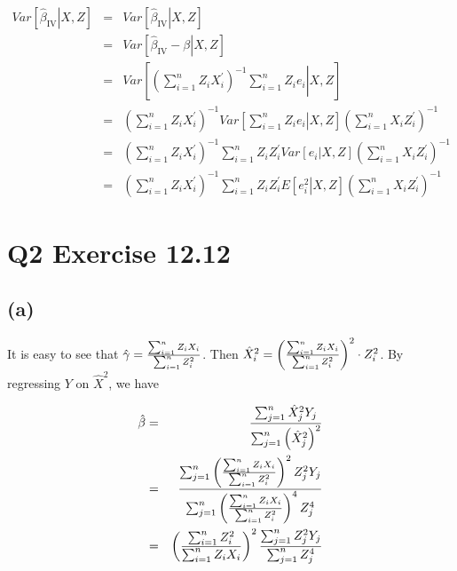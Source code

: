 \documentclass{article}
\begin{document}
\begin{eqnarray*}
Var\left[ \left. \hat{\beta}_{\text{IV}}\right\vert X,Z\right] &=&Var\left[
\left. \hat{\beta}_{\text{IV}}\right\vert X,Z\right] \\
&=&Var\left[ \left. \hat{\beta}_{\text{IV}}-\beta \right\vert X,Z\right] \\
&=&Var\left[ \left. \left( \sum_{i=1}^{n}Z_{i}X_{i}^{\prime }\right)
^{-1}\sum_{i=1}^{n}Z_{i}e_{i}\right\vert X,Z\right] \\
&=&\left( \sum_{i=1}^{n}Z_{i}X_{i}^{\prime }\right) ^{-1}Var\left[ \left.
\sum_{i=1}^{n}Z_{i}e_{i}\right\vert X,Z\right] \left(
\sum_{i=1}^{n}X_{i}Z_{i}^{\prime }\right) ^{-1} \\
&=&\left( \sum_{i=1}^{n}Z_{i}X_{i}^{\prime }\right)
^{-1}\sum_{i=1}^{n}Z_{i}Z_{i}^{\prime }Var\left[ \left. e_{i}\right\vert X,Z%
\right] \left( \sum_{i=1}^{n}X_{i}Z_{i}^{\prime }\right) ^{-1} \\
&=&\left( \sum_{i=1}^{n}Z_{i}X_{i}^{\prime }\right)
^{-1}\sum_{i=1}^{n}Z_{i}Z_{i}^{\prime }E\left[ \left. e_{i}^{2}\right\vert
X,Z\right] \left( \sum_{i=1}^{n}X_{i}Z_{i}^{\prime }\right) ^{-1}
\end{eqnarray*}

\section*{Q2 Exercise 12.12}

\subsection*{(a)}

It is easy to see that $\hat{\gamma}=\frac{\sum_{i=1}^{n}Z_{i}X_{i}}{%
\sum_{i=1}^{n}Z_{i}^{2}}$. Then $\hat{X}_{i}^{2}=\left( \frac{%
\sum_{i=1}^{n}Z_{i}X_{i}}{\sum_{i=1}^{n}Z_{i}^{2}}\right) ^{2}\cdot
Z_{i}^{2} $. By regressing $Y$ on $\hat{X}^{2}$, we have

\begin{eqnarray*}
\hat{\beta} &=&\frac{\sum_{j=1}^{n}\hat{X}_{j}^{2}Y_{j}}{\sum_{j=1}^{n}%
\left( \hat{X}_{j}^{2}\right) ^{2}} \\
&=&\frac{\sum_{j=1}^{n}\left( \frac{\sum_{i=1}^{n}Z_{i}X_{i}}{%
\sum_{i=1}^{n}Z_{i}^{2}}\right) ^{2}Z_{j}^{2}Y_{j}}{\sum_{j=1}^{n}\left( 
\frac{\sum_{i=1}^{n}Z_{i}X_{i}}{\sum_{i=1}^{n}Z_{i}^{2}}\right) ^{4}Z_{j}^{4}%
} \\
&=&\left( \frac{\sum_{i=1}^{n}Z_{i}^{2}}{\sum_{i=1}^{n}Z_{i}X_{i}}\right)
^{2}\frac{\sum_{j=1}^{n}Z_{j}^{2}Y_{j}}{\sum_{j=1}^{n}Z_{j}^{4}}
\end{eqnarray*}
\end{document}
